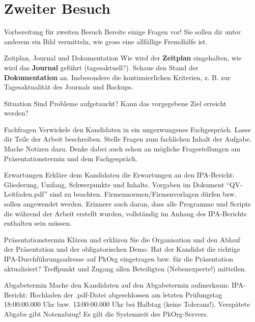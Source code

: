 \chapter{Zweiter Besuch}
\begin{taskitem}{Vorbereitung für zweiten Besuch}
  Bereite einige Fragen vor! Sie sollen dir unter anderem ein Bild vermitteln, wie gross eine allfällige Fremdhilfe ist.
\end{taskitem}
\begin{taskitem}{Zeitplan, Journal und Dokumentation}
  Wie wird der \textbf{Zeitplan} eingehalten, wie wird das \textbf{Journal} geführt (tagesaktuell?). Schaue den Stand der \textbf{Dokumentation} an. Insbesondere die kontinuierlichen Kriterien, z. B. zur Tagesaktualität des Journals und Backups.
\end{taskitem}
\begin{taskitem}{Situation}
  Sind Probleme aufgetaucht? Kann das vorgegebene Ziel erreicht werden?
\end{taskitem}
\begin{taskitem}{Fachfragen}
  Verwickele den Kandidaten in ein ungezwungenes Fachgespräch. Lasse dir Teile der Arbeit beschreiben. Stelle Fragen zum fachlichen Inhalt der Aufgabe. Mache Notizen dazu. Denke dabei auch schon an mögliche Fragestellungen am Präsentationstermin und dem Fachgespräch.
\end{taskitem}
\begin{taskitem}{Erwartungen}
  Erkläre dem Kandidaten die Erwartungen an den IPA-Bericht: Gliederung, Umfang, Schwerpunkte und Inhalte. Vorgaben im Dokument \enquote{QV-Leitfaden.pdf} sind zu beachten. Firmennormen/Firmenvorlagen dürfen bzw. sollen angewendet werden. Erinnere auch daran, dass alle Programme und Scripts die während der Arbeit erstellt wurden, vollständig im Anhang des IPA-Berichts enthalten sein müssen.
\end{taskitem}
\begin{taskitem}{Präsentationstermin}
  Klären und erklären Sie die Organisation und den Ablauf der Präsentation und der obligatorischen Demo. Hat der Kandidat die richtige IPA-Durchführungsadresse auf PkOrg eingetragen bzw. für die Präsentation aktualisiert? Treffpunkt und Zugang allen Beteiligten (Nebenexperte!) mitteilen.
\end{taskitem}
\begin{taskitem}{Abgabetermin}
  Mache den Kandidaten auf den Abgabetermin aufmerksam: IPA-Bericht: Hochladen der .pdf-Datei abgeschlossen am letzten Prüfungstag 18:00:00.000 Uhr bzw. 13:00:00.000 Uhr bei Halbtag (keine Toleranz!). Verspätete Abgabe gibt Notenabzug! Es gilt die Systemzeit des PkOrg-Servers.
\end{taskitem}

